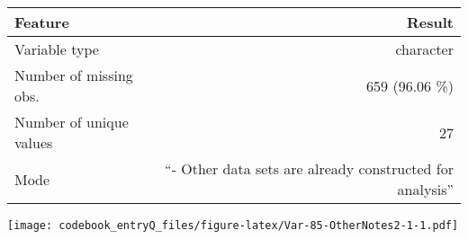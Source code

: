 \documentclass[]{article}
\newcommand{\bminione}{\begin{minipage}{0.75 \textwidth}}
\newcommand{\bminitwo}{\begin{minipage}{0.25 \textwidth}}
\newcommand{\emini}{\end{minipage}}
\begin{document}
\bminione

\begin{longtable}[]{@{}lr@{}}
\toprule
\begin{minipage}[b]{0.29\columnwidth}\raggedright\strut
Feature\strut
\end{minipage} & \begin{minipage}[b]{0.65\columnwidth}\raggedleft\strut
Result\strut
\end{minipage}\tabularnewline
\midrule
\endhead
\begin{minipage}[t]{0.29\columnwidth}\raggedright\strut
Variable type\strut
\end{minipage} & \begin{minipage}[t]{0.65\columnwidth}\raggedleft\strut
character\strut
\end{minipage}\tabularnewline
\begin{minipage}[t]{0.29\columnwidth}\raggedright\strut
Number of missing obs.\strut
\end{minipage} & \begin{minipage}[t]{0.65\columnwidth}\raggedleft\strut
659 (96.06 \%)\strut
\end{minipage}\tabularnewline
\begin{minipage}[t]{0.29\columnwidth}\raggedright\strut
Number of unique values\strut
\end{minipage} & \begin{minipage}[t]{0.65\columnwidth}\raggedleft\strut
27\strut
\end{minipage}\tabularnewline
\begin{minipage}[t]{0.29\columnwidth}\raggedright\strut
Mode\strut
\end{minipage} & \begin{minipage}[t]{0.65\columnwidth}\raggedleft\strut
``- Other data sets are already constructed for analysis''\strut
\end{minipage}\tabularnewline
\bottomrule
\end{longtable}

\emini
\bminitwo
\texttt{[image: codebook\_entryQ\_files/figure-latex/Var-85-OtherNotes2-1-1.pdf]}
\emini
\end{document}
